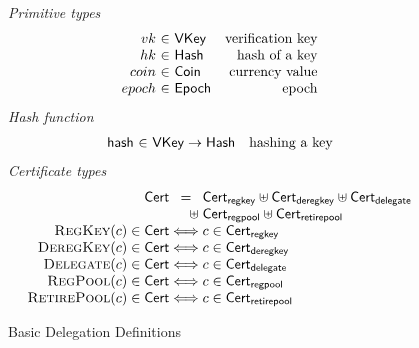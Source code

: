 \documentclass[11pt,a4paper]{article}
\newcommand{\uniondistinct}{\uplus}
\newcommand{\fun}[1]{\mathsf{#1}}
\newcommand{\type}[1]{\mathsf{#1}}
\begin{document}
\begin{figure}

\emph{Primitive types}
%
\begin{equation*}
\begin{array}{r@{~\in~}lr}
  vk & \type{VKey} & \text{verification key}
\\
  hk & \type{Hash} & \text{hash of a key}
\\
  coin & \type{Coin} & \text{currency value}
\\
epoch & \type{Epoch} & \text{epoch}
\end{array}
\end{equation*}
%
\emph{Hash function}
%
\begin{equation*}
\begin{array}{r@{~\in~}lr}
  \fun{hash} & \type{VKey} \to \type{Hash}
& \text{hashing a key}
\end{array}
\end{equation*}
%
\emph{Certificate types}
%
\begin{equation*}
\begin{array}{r@{}c@{}l}
  \type{Cert} &=& \type{Cert_{regkey}} \uniondistinct
                \type{Cert_{deregkey}} \uniondistinct
                \type{Cert_{delegate}} \\
              &\hfill\uniondistinct\;&
                \type{Cert_{regpool}} \uniondistinct
                \type{Cert_{retirepool}} \\
  \textsc{RegKey}(c) \in \type{Cert} &\iff& c \in \type{Cert_{regkey}} \\
  \textsc{DeregKey}(c) \in \type{Cert} &\iff& c \in \type{Cert_{deregkey}} \\
  \textsc{Delegate}(c) \in \type{Cert} &\iff& c \in \type{Cert_{delegate}} \\
  \textsc{RegPool}(c) \in \type{Cert} &\iff& c \in \type{Cert_{regpool}} \\
  \textsc{RetirePool}(c) \in \type{Cert} &\iff& c \in \type{Cert_{retirepool}} \\
\end{array}
\end{equation*}

\caption{Basic Delegation Definitions}
\label{fig:basic_delegation}
\end{figure}
\end{document}
